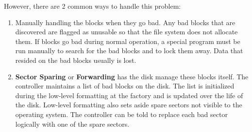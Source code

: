 However, there are 2 common ways to handle this problem:
\begin{enumerate}[noitemsep]
\item Manually handling the blocks when they go bad.
  Any bad blocks that are discovered are flagged as unusable so that the file system does not allocate them.
  If blocks go bad during normal operation, a special program must be run manually to search for the bad blocks and to lock them away.
  Data that resided on the bad blocks usually is lost.

\item \textbf{Sector Sparing} or \textbf{Forwarding} has the disk manage these blocks itself.
  The controller maintains a list of bad blocks on the disk.
  The list is initialized during the low-level formatting at the factory and is updated over the life of the disk.
  Low-level formatting also sets aside spare sectors not visible to the operating system.
  The controller can be told to replace each bad sector logically with one of the spare sectors.
\end{enumerate}


